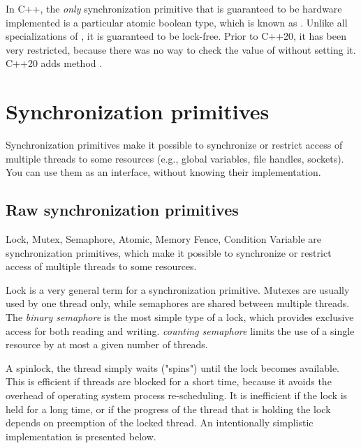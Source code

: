 In C++, the \emph{only} synchronization primitive that is guaranteed to be hardware implemented is a particular atomic boolean type, which is known as . Unlike all specializations of , it is guaranteed to be lock-free. Prior to C++20, it has been very restricted, because there was no way to check the value of  without setting it. C++20 adds method . 



\section{Synchronization primitives}

Synchronization primitives make it possible to synchronize or restrict access of multiple threads to some resources (e.g., global variables, file handles, sockets). You can use them as an interface, without knowing their implementation. 

\subsection{Raw synchronization primitives}

Lock, Mutex, Semaphore, Atomic, Memory Fence, Condition Variable are synchronization primitives, which make it possible to synchronize or restrict access of multiple threads to some resources. 

Lock is a very general term for a synchronization primitive. Mutexes are usually used by one thread only, while semaphores are shared between multiple threads. The \emph{binary semaphore} is the most simple type of a lock, which provides exclusive access for both reading and writing. \emph{counting semaphore} limits the use of a single resource by at most a given number of threads. 

A spinlock, the thread simply waits ("spins") until the lock becomes available. This is efficient if threads are blocked for a short time, because it avoids the overhead of operating system process re-scheduling. It is inefficient if the lock is held for a long time, or if the progress of the thread that is holding the lock depends on preemption of the locked thread. An intentionally simplistic implementation is presented below.

